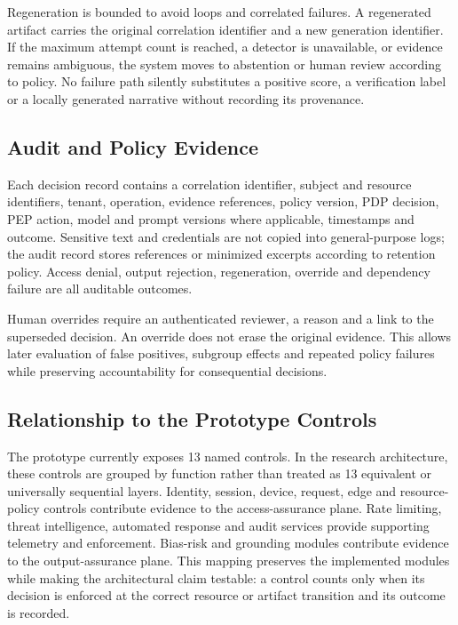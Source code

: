 \documentclass[conference]{IEEEtran}
\begin{document}
Regeneration is bounded to avoid loops and correlated failures. A regenerated artifact carries the original correlation identifier and a new generation identifier. If the maximum attempt count is reached, a detector is unavailable, or evidence remains ambiguous, the system moves to abstention or human review according to policy. No failure path silently substitutes a positive score, a verification label or a locally generated narrative without recording its provenance.

\subsection{Audit and Policy Evidence}

Each decision record contains a correlation identifier, subject and resource identifiers, tenant, operation, evidence references, policy version, PDP decision, PEP action, model and prompt versions where applicable, timestamps and outcome. Sensitive text and credentials are not copied into general-purpose logs; the audit record stores references or minimized excerpts according to retention policy. Access denial, output rejection, regeneration, override and dependency failure are all auditable outcomes.

Human overrides require an authenticated reviewer, a reason and a link to the superseded decision. An override does not erase the original evidence. This allows later evaluation of false positives, subgroup effects and repeated policy failures while preserving accountability for consequential decisions.

\subsection{Relationship to the Prototype Controls}

The prototype currently exposes 13 named controls. In the research architecture, these controls are grouped by function rather than treated as 13 equivalent or universally sequential layers. Identity, session, device, request, edge and resource-policy controls contribute evidence to the access-assurance plane. Rate limiting, threat intelligence, automated response and audit services provide supporting telemetry and enforcement. Bias-risk and grounding modules contribute evidence to the output-assurance plane. This mapping preserves the implemented modules while making the architectural claim testable: a control counts only when its decision is enforced at the correct resource or artifact transition and its outcome is recorded.
\end{document}
